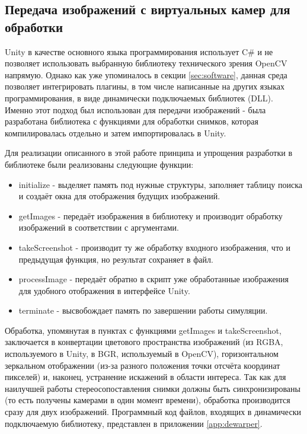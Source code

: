 \subsection{Передача изображений с виртуальных камер для обработки}

Unity в качестве основного языка программирования использует C\# и не позволяет использовать 
выбранную библиотеку технического зрения OpenCV напрямую. Однако как уже упоминалось в секции 
\ref{sec:software}, данная среда позволяет интегрировать плагины, в том числе написанные на 
других языках программирования, в виде динамически подключаемых библиотек (DLL). Именно этот 
подход был использован для передачи изображений - была разработана библиотека с функциями для 
обработки снимков, которая компилировалась отдельно и затем импортировалась в Unity. 

Для реализации описанного в этой работе принципа и упрощения разработки в библиотеке были реализованы 
следующие функции:
\begin{itemize}
    \item initialize - выделяет память под нужные структуры, заполняет таблицу поиска и создаёт окна 
    для отображения будущих изображений.
    \item getImages - передаёт изображения в библиотеку и производит обработку изображений в 
    соответствии с аргументами. 
    \item takeScreenshot - производит ту же обработку входного изображения, что и предыдущая функция,
     но результат сохраняет в файл. 
    \item processImage - передаёт обратно в скрипт уже обработанные изображения для удобного отображения
    в интерфейсе Unity. 
    \item terminate - высвобождает память по завершении работы симуляции.      
\end{itemize}
Обработка, упомянутая в пунктах с функциями getImages и takeScreenshot, заключается в конвертации 
цветового пространства изображений (из RGBA, используемого в Unity, в BGR, используемый в OpenCV), 
горизонтальном зеркальном отображении (из-за разного положения точки отсчёта координат пикселей)
и, наконец, устранение искажений в области интереса. Так как для наилучшей работы стереосопоставления
снимки должны быть синхронизированы (то есть получены камерами в один момент времени), обработка 
производится сразу для двух изображений. Программный код файлов, входящих в динамически 
подключаемую библиотеку, представлен в приложении \ref{app:dewarper}.

